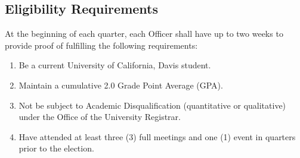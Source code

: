 \documentclass{article}
\newenvironment{li}{
\begin{enumerate}
  \setlength{\itemsep}{1pt}
  \setlength{\parskip}{0pt}
  \setlength{\parsep}{0pt}
}{\end{enumerate}}
\begin{document}
\subsection{Eligibility Requirements}
At the beginning of each quarter, each Officer shall have up to two weeks to provide proof of fulfilling the following requirements:
\begin{li}
\item Be a current University of California, Davis student.
\item Maintain a cumulative 2.0 Grade Point Average (GPA).
\item Not be subject to Academic Disqualification (quantitative or qualitative) under the Office of the University Registrar.
\item Have attended at least three (3) full meetings and one (1) event in quarters prior to the election.
\end{li}
\end{document}
